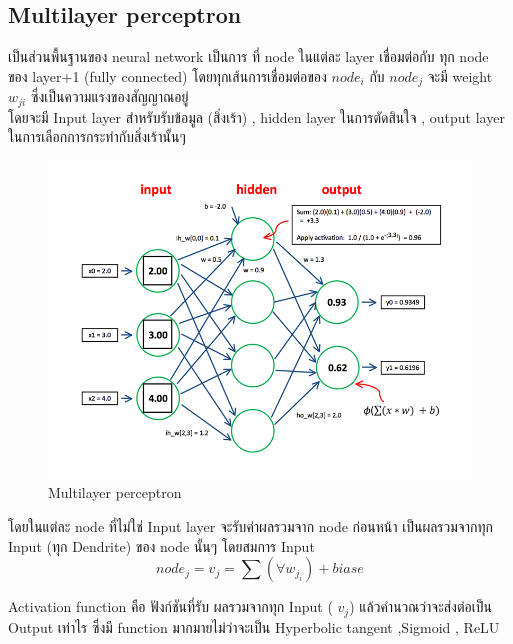 \subsection{Multilayer perceptron}
เป็นส่วนพื้นฐานของ neural network เป็นการ ที่ node ในแต่ละ layer เชื่อมต่อกับ ทุก node ของ layer+1 (fully connected)
โดยทุกเส้นการเชื่อมต่อของ $node_i$  กับ $node_j$ จะมี weight $w_{ji}$  ซึ่งเป็นความแรงของสัญญาณอยู่ 
\\ โดยจะมี Input layer สำหรับรับข้อมูล (สิ่งเร้า) , hidden layer ในการตัดสินใจ , output layer ในการเลือกการกระทำกับสิ่งเร้านั้นๆ
\begin{figure}[h]
  \begin{center}
  \includegraphics[scale=0.5]{pic/mlp.png}
  \end{center}
  \caption[Multilayer perceptron]{Multilayer perceptron}
  \label{fig:Multilayer perceptron}
  \end{figure}

โดยในแต่ละ node ที่ไม่ใช่ Input layer จะรับค่าผลรวมจาก node ก่อนหน้า เป็นผลรวมจากทุก Input (ทุก Dendrite) ของ node นั้นๆ
\newline
โดยสมการ Input \begin{equation} node_j  =  v_j = \sum(\forall w_{j_i})+biase \end{equation}

Activation function คือ ฟังก์ชันที่รับ ผลรวมจากทุก Input ( $v_j $)  แล้วคำนวณว่าจะส่งต่อเป็น Output เท่าไร
ซึ่งมี function มากมายไม่ว่าจะเป็น Hyperbolic tangent ,Sigmoid , ReLU

